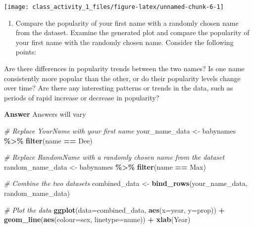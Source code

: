 \documentclass[
]{book}
\newenvironment{Shaded}{\begin{snugshade}}{\end{snugshade}}
\newcommand{\AttributeTok}[1]{\textcolor[rgb]{0.13,0.29,0.53}{#1}}
\newcommand{\CommentTok}[1]{\textcolor[rgb]{0.56,0.35,0.01}{\textit{#1}}}
\newcommand{\FunctionTok}[1]{\textcolor[rgb]{0.13,0.29,0.53}{\textbf{#1}}}
\newcommand{\NormalTok}[1]{#1}
\newcommand{\OtherTok}[1]{\textcolor[rgb]{0.56,0.35,0.01}{#1}}
\newcommand{\SpecialCharTok}[1]{\textcolor[rgb]{0.81,0.36,0.00}{\textbf{#1}}}
\newcommand{\StringTok}[1]{\textcolor[rgb]{0.31,0.60,0.02}{#1}}
\providecommand{\tightlist}{%
  \setlength{\itemsep}{0pt}\setlength{\parskip}{0pt}}
\begin{document}
\texttt{[image: class\_activity\_1\_files/figure-latex/unnamed-chunk-6-1]}

\begin{enumerate}
\def\labelenumi{\arabic{enumi}.}
\setcounter{enumi}{3}
\tightlist
\item
  Compare the popularity of your first name with a randomly chosen name from the dataset. Examine the generated plot and compare the popularity of your first name with the randomly chosen name. Consider the following points:
\end{enumerate}

Are there differences in popularity trends between the two names? Is one name consistently more popular than the other, or do their popularity levels change over time? Are there any interesting patterns or trends in the data, such as periods of rapid increase or decrease in popularity?

\textbf{Answer} Answers will vary

\vspace*{0.2in}

\begin{Shaded}
\begin{Highlighting}[]
\CommentTok{\# Replace \textquotesingle{}YourName\textquotesingle{} with your first name}
\NormalTok{your\_name\_data }\OtherTok{\textless{}{-}}\NormalTok{ babynames }\SpecialCharTok{\%\textgreater{}\%} \FunctionTok{filter}\NormalTok{(name }\SpecialCharTok{==} \StringTok{\textquotesingle{}Dee\textquotesingle{}}\NormalTok{)}

\CommentTok{\# Replace \textquotesingle{}RandomName\textquotesingle{} with a randomly chosen name from the dataset}
\NormalTok{random\_name\_data }\OtherTok{\textless{}{-}}\NormalTok{ babynames }\SpecialCharTok{\%\textgreater{}\%} \FunctionTok{filter}\NormalTok{(name }\SpecialCharTok{==} \StringTok{\textquotesingle{}Max\textquotesingle{}}\NormalTok{)}

\CommentTok{\# Combine the two datasets}
\NormalTok{combined\_data }\OtherTok{\textless{}{-}} \FunctionTok{bind\_rows}\NormalTok{(your\_name\_data, random\_name\_data)}

\CommentTok{\# Plot the data}
\FunctionTok{ggplot}\NormalTok{(}\AttributeTok{data=}\NormalTok{combined\_data, }\FunctionTok{aes}\NormalTok{(}\AttributeTok{x=}\NormalTok{year, }\AttributeTok{y=}\NormalTok{prop)) }\SpecialCharTok{+} 
  \FunctionTok{geom\_line}\NormalTok{(}\FunctionTok{aes}\NormalTok{(}\AttributeTok{colour=}\NormalTok{sex, }\AttributeTok{linetype=}\NormalTok{name)) }\SpecialCharTok{+} 
  \FunctionTok{xlab}\NormalTok{(}\StringTok{\textquotesingle{}Year\textquotesingle{}}\NormalTok{) }
\end{Highlighting}
\end{Shaded}
\end{document}
